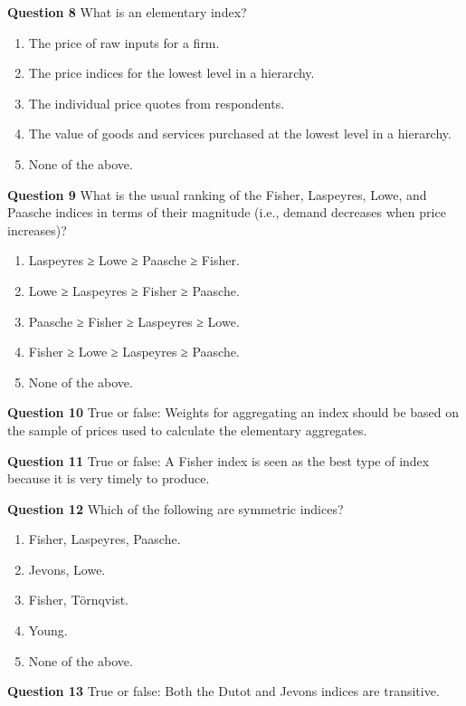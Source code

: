 \documentclass[
]{article}
\begin{document}
\textbf{Question 8} What is an elementary index?

\begin{enumerate}
\def\labelenumi{\alph{enumi})}
\item
  The price of raw inputs for a firm.
\item
  The price indices for the lowest level in a hierarchy.
\item
  The individual price quotes from respondents.
\item
  The value of goods and services purchased at the lowest level in a hierarchy.
\item
  None of the above.
\end{enumerate}

\textbf{Question 9} What is the usual ranking of the Fisher, Laspeyres, Lowe, and Paasche indices in terms of their magnitude (i.e., demand decreases when price increases)?

\begin{enumerate}
\def\labelenumi{\alph{enumi})}
\item
  Laspeyres ≥ Lowe ≥ Paasche ≥ Fisher.
\item
  Lowe ≥ Laspeyres ≥ Fisher ≥ Paasche.
\item
  Paasche ≥ Fisher ≥ Laspeyres ≥ Lowe.
\item
  Fisher ≥ Lowe ≥ Laspeyres ≥ Paasche.
\item
  None of the above.
\end{enumerate}

\textbf{Question 10} True or false: Weights for aggregating an index should be based on the sample of prices used to calculate the elementary aggregates.

\textbf{Question 11} True or false: A Fisher index is seen as the best type of index because it is very timely to produce.

\textbf{Question 12} Which of the following are symmetric indices?

\begin{enumerate}
\def\labelenumi{\alph{enumi})}
\item
  Fisher, Laspeyres, Paasche.
\item
  Jevons, Lowe.
\item
  Fisher, Törnqvist.
\item
  Young.
\item
  None of the above.
\end{enumerate}

\textbf{Question 13} True or false: Both the Dutot and Jevons indices are transitive.
\end{document}
